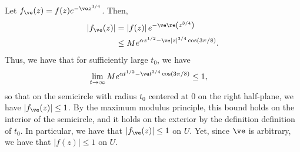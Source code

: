 \documentclass[10pt]{mypackage}
\begin{document}
\begin{solution}
  Let $f_{\ve}(z) = f(z)e^{-\ve z^{3/4}}$. Then,
  \begin{align*}
    \left\vert f_{\ve}(z) \right\vert &= \left\vert f(z) \right\vert e^{-\ve \re\left( z^{3/4} \right)}\\
                                      &\leq Me^{\alpha z^{1/2} - \ve \left\vert z \right\vert^{3/4}\cos\left( 3\pi/8 \right)}.
  \end{align*}
  Thus, we have that for sufficiently large $t_0$, we have
  \begin{align*}
    \lim_{t\rightarrow\infty} Me^{\alpha t^{1/2} - \ve t^{3/4}\cos\left( 3\pi/8\right)} &\leq 1,
  \end{align*}
  so that on the semicircle with radius $t_0$ centered at $0$ on the right half-plane, we have $\left\vert f_{\ve}(z) \right\vert \leq 1$. By the maximum modulus principle, this bound holds on the interior of the semicircle, and it holds on the exterior by the definition definition of $t_0$. In particular, we have that $\left\vert f_{\ve}(z) \right\vert \leq 1$ on $U$. Yet, since $\ve$ is arbitrary, we have that $\left\vert f(z) \right\vert\leq 1$ on $U$.
\end{solution}
\end{document}
